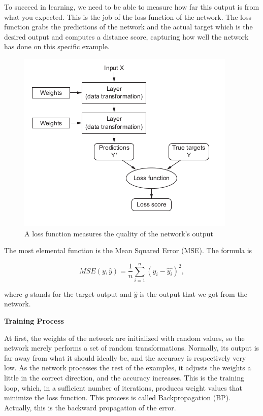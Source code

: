 To succeed in learning, we need to be able to measure how far this output is from what you expected.
This is the job of the loss function of the network.
The loss function grabs the predictions of the network and the actual target which is the desired
output and computes a distance score,
capturing how well the network has done on this specific example.

\begin{figure}[H]
    \centering
    \includegraphics[scale=1.]{./images/background/loss.png}
    \caption{A loss function measures the quality of the network’s output}
    \label{fig:loss}
\end{figure}

The most elemental function is the Mean Squared Error (MSE).
The formula is

\begin{equation}
    MSE(y,\hat{y}) = \frac{1}{n} \sum_{i=1}^{n} (y_i - \hat{y_i})^2 ,\label{eq:equation2}
\end{equation}

where $y$ stands for the target output and $\hat{y}$ is the output that we got from the network.

{\large \textbf{Training Process}}

At first, the weights of the network are initialized with random values, so the network merely
performs a set of random transformations.
Normally, its output is far away from what it should ideally be, and the accuracy is respectively very low.
As the network processes the rest of the examples, it adjusts the weights a little in the correct
direction, and the accuracy increases.
This is the training loop, which, in a sufficient number of iterations, produces weight values that
minimize the loss function.
This process is called Backpropagation (BP).
Actually, this is the backward propagation of the error.


